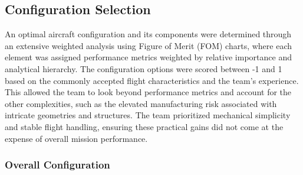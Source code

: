 \documentclass[10pt, letterpaper]{article}
\begin{document}
\subsection{Configuration Selection}
\label{sec:config_select}
An optimal aircraft configuration and its components were determined through an extensive weighted analysis using Figure of Merit (FOM) charts, where each element was assigned performance metrics weighted by relative importance and analytical hierarchy. The configuration options were scored between -1 and 1 based on the commonly accepted flight characteristics and the team’s experience. This allowed the team to look beyond performance metrics and account for the other complexities, such as the elevated manufacturing risk associated with intricate geometries and structures. The team prioritized mechanical simplicity and stable flight handling, ensuring these practical gains did not come at the expense of overall mission performance.
\subsubsection{Overall Configuration}
\end{document}
